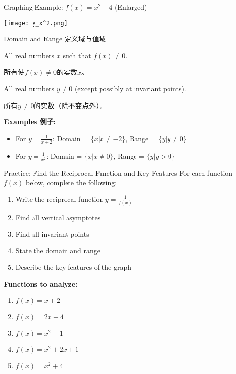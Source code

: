 \documentclass[aspectratio=169]{beamer}
\begin{document}
\begin{frame}{Graphing Example: $f(x) = x^2 - 4$ (Enlarged)}
    \begin{center}
        \texttt{[image: y\_x^2.png]}
    \end{center}
\end{frame}

\begin{frame}{Domain and Range 定义域与值域}
    \begin{tcolorbox}[colback=lightgray,colframe=primary,title=Domain 定义域]
        \footnotesize
        All real numbers $x$ such that $f(x) \neq 0$.
        \par
        所有使$f(x) \neq 0$的实数$x$。
    \end{tcolorbox}
    \vspace{1em}
    \begin{tcolorbox}[colback=lightgray,colframe=primary,title=Range 值域]
        \footnotesize
        All real numbers $y \neq 0$ (except possibly at invariant points).
        \par
        所有$y \neq 0$的实数（除不变点外）。
    \end{tcolorbox}
    \vspace{1em}
    \textbf{Examples 例子:}
    \begin{itemize}
        \item For $y = \frac{1}{x + 2}$: Domain = $\{x | x \neq -2\}$, Range = $\{y | y \neq 0\}$
        \item For $y = \frac{1}{x^2}$: Domain = $\{x | x \neq 0\}$, Range = $\{y | y > 0\}$
    \end{itemize}
\end{frame}

\begin{frame}{Practice: Find the Reciprocal Function and Key Features}
    \footnotesize
    For each function $f(x)$ below, complete the following:
    \begin{enumerate}
        \item Write the reciprocal function $y = \frac{1}{f(x)}$
        \item Find all vertical asymptotes
        \item Find all invariant points
        \item State the domain and range
        \item Describe the key features of the graph
    \end{enumerate}
    \vspace{1em}
    \textbf{Functions to analyze:}
    \begin{enumerate}[label=Q\arabic*]
        \item $f(x) = x + 2$
        \item $f(x) = 2x - 4$
        \item $f(x) = x^2 - 1$
        \item $f(x) = x^2 + 2x + 1$
        \item $f(x) = x^2 + 4$
    \end{enumerate}
\end{frame}
\end{document}
